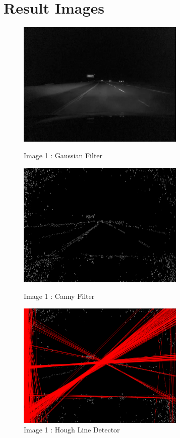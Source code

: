 \documentclass[12pt,a4paper]{report}
\begin{document}
\chapter{Result Images}
\begin{figure}[!htb]
  \centering
  \includegraphics[height=6cm]{result_img/img1_q1.png}
  \caption{Image 1 : Gaussian Filter}
  \includegraphics[height=6cm]{result_img/img1_q2.png}
  \caption{Image 1 : Canny Filter}
  \includegraphics[height=6cm]{result_img/img1_q3.png}
  \caption{Image 1 : Hough Line Detector}
\end{figure}
\end{document}
